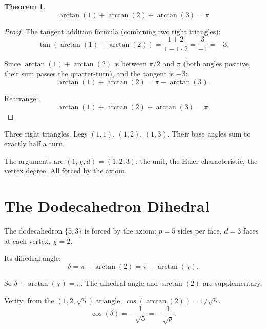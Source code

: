 \documentclass[11pt,a4paper]{article}
\theoremstyle{plain}
\newtheorem{theorem}{Theorem}[section]
\theoremstyle{definition}
\begin{document}
\begin{theorem}\label{thm:decomp}
\begin{equation}\label{eq:decomp}
  \boxed{\; \arctan(1) + \arctan(2) + \arctan(3) = \pi \;}
\end{equation}
\end{theorem}

\begin{proof}
The tangent addition formula (combining two right triangles):
\begin{equation}
  \tan(\arctan(1) + \arctan(2)) = \frac{1 + 2}{1 - 1 \cdot 2} = \frac{3}{-1} = -3.
\end{equation}

Since $\arctan(1) + \arctan(2)$ is between $\pi/2$ and $\pi$ (both angles
positive, their sum passes the quarter-turn), and the tangent is $-3$:
\begin{equation}
  \arctan(1) + \arctan(2) = \pi - \arctan(3).
\end{equation}

Rearrange:
\begin{equation}
  \arctan(1) + \arctan(2) + \arctan(3) = \pi.
\end{equation}
\end{proof}

Three right triangles. Legs $(1,1)$, $(1,2)$, $(1,3)$. Their base angles
sum to exactly half a turn.

The arguments are $(1, \chi, d) = (1, 2, 3)$: the unit, the Euler
characteristic, the vertex degree. All forced by the axiom.

\section{The Dodecahedron Dihedral}

The dodecahedron $\{5, 3\}$ is forced by the axiom: $p = 5$ sides per face,
$d = 3$ faces at each vertex, $\chi = 2$.

Its dihedral angle:
\begin{equation}\label{eq:dihedral}
  \delta = \pi - \arctan(2) = \pi - \arctan(\chi).
\end{equation}

So $\delta + \arctan(\chi) = \pi$. The dihedral angle and $\arctan(2)$
are supplementary.

Verify: from the $(1, 2, \sqrt{5})$ triangle, $\cos(\arctan(2)) = 1/\sqrt{5}$.
\begin{equation}
  \cos(\delta) = -\frac{1}{\sqrt{5}} = -\frac{1}{\sqrt{p}}.
\end{equation}
\end{document}
